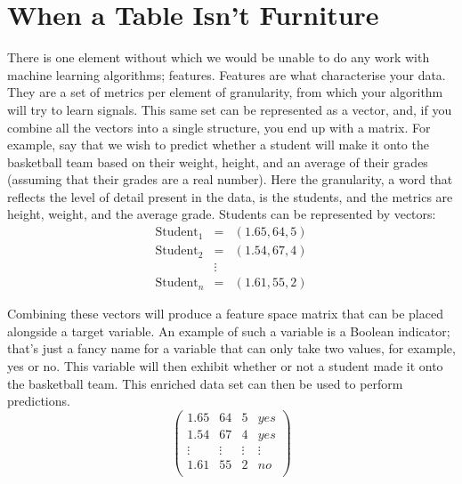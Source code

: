 \documentclass[600paper, 11pt,twoside,openany]{kdp}
\begin{document}
\section{When a Table Isn’t Furniture}
\indent There is one element without which we would be unable to do any work with machine learning algorithms; features. Features are what characterise your data. They are a set of metrics per element of granularity, from which your algorithm will try to learn signals. This same set can be represented as a vector, and, if you combine all the vectors into a single structure, you end up with a matrix. For example, say that we wish to predict whether a student will make it onto the basketball team based on their weight, height, and an average of their grades (assuming that their grades are a real number). Here the granularity, a word that reflects the level of detail present in the data, is the students, and the metrics are height, weight, and the average grade. Students can be represented by vectors:
\begin{eqnarray*}
 \textrm{Student}_1  &=&  (1.65, 64, 5) \\
 \textrm{Student}_2 &=& (1.54, 67, 4) \\
        &\vdots& \\
  \textrm{Student}_n &=& (1.61, 55,2)
\end{eqnarray*}

Combining these vectors will produce a feature space matrix that can be placed alongside a target variable. An example of such a variable is a Boolean indicator; that’s just a fancy name for a variable that can only take two values, for example, yes or no. This variable will then exhibit whether or not a student made it onto the basketball team. This enriched data set can then be used to perform predictions.
\[
\begin{pmatrix}
1.65 & 64 & 5 & yes\\
1.54 & 67 & 4 & yes\\
\vdots & \vdots & \vdots & \vdots\\
1.61 & 55 & 2 & no\\
\end{pmatrix}
\]
\end{document}
